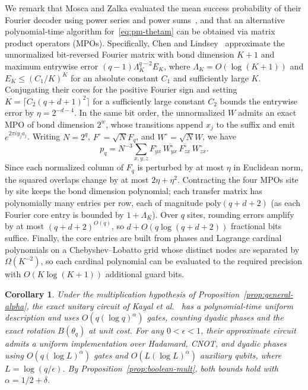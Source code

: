 \documentclass[11pt]{article}
\newtheorem{corollary}[theorem]{Corollary}
\begin{document}
We remark that Mosca and Zalka evaluated the mean success probability of their Fourier decoder using power series and power sums~\cite[Section 4.1]{mz2003}, and that an alternative polynomial-time algorithm for~\eqref{eq:pm-thetam} can be obtained via matrix product operators (MPOs). Specifically, Chen and Lindsey~\cite[Theorem 4]{cl2024} approximate the unnormalized bit-reversed Fourier matrix with bond dimension $K+1$ and maximum entrywise error $(q-1)\Lambda_K^{q-2} E_K$, where $\Lambda_K = O(\log(K+1))$ and $E_K \le (C_1/K)^K$ for an absolute constant $C_1$ and sufficiently large $K$. Conjugating their cores for the positive Fourier sign and setting $K = \lceil C_2(q+d+1)^2 \rceil$ for a sufficiently large constant $C_2$ bounds the entrywise error by $\eta = 2^{-d-4}$. In the same bit order, the unnormalized $W$ admits an exact MPO of bond dimension $2^w$, whose transitions append $x_j$ to the suffix and emit $e^{2\pi i y_j a_j}$. Writing $N = 2^q$, $F^\circ = \sqrt{N}F_q$, and $W^\circ = \sqrt{N}W$, we have
\[
p_q = N^{-3}\sum_{x, y, z} F^\circ_{yx}\,\overline{W^\circ_{yx}}\,\overline{F^\circ_{zx}}\,W^\circ_{zx}.
\]
Since each normalized column of $F_q$ is perturbed by at most $\eta$ in Euclidean norm, the squared overlaps change by at most $2\eta + \eta^2$. Contracting the four MPOs site by site keeps the bond dimension polynomial; each transfer matrix has polynomially many entries per row, each of magnitude $\mathrm{poly}(q+d+2)$ (as each Fourier core entry is bounded by $1 + \Lambda_K$). Over $q$ sites, rounding errors amplify by at most $(q+d+2)^{O(q)}$, so $d + O(q\log(q+d+2))$ fractional bits suffice. Finally, the core entries are built from phases and Lagrange cardinal polynomials on a Chebyshev--Lobatto grid whose distinct nodes are separated by $\Omega(K^{-2})$, so each cardinal polynomial can be evaluated to the required precision with $O(K\log(K+1))$ additional guard bits.

\begin{corollary}\label{cor:exact-approx}
Under the multiplication hypothesis of Proposition~\ref{prop:general-alpha}, the exact unitary circuit of Kayal et al.~\cite{kmps2026} has a polynomial-time uniform description and uses $O(q(\log q)^\alpha)$ gates, counting dyadic phases and the exact rotation $B(\theta_q)$ at unit cost. For any $0 < \epsilon < 1$, their approximate circuit admits a uniform implementation over Hadamard, CNOT, and dyadic phases using $O(q(\log L)^\alpha)$ gates and $O(L(\log L)^\alpha)$ auxiliary qubits, where $L = \log(q/\epsilon)$. By Proposition~\ref{prop:boolean-mult}, both bounds hold with $\alpha = 1/2 + \delta$.
\end{corollary}
\end{document}
